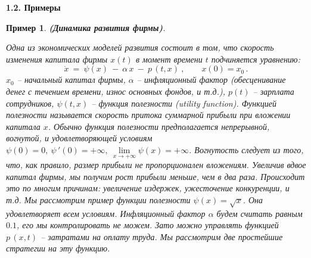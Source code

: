 \documentclass[12pt,a4paper]{article}
\newtheorem{ex}{Пример}
\begin{document}
\begin{center}
\textbf{1.2. Примеры}
\end{center}
\medskip

\begin{ex}\label{ex.firm}\textbf{(Динамика развития фирмы)}.
{\em Одна из экономических моделей развития состоит в том, что скорость изменения 
капитала фирмы $x(t)$ в момент времени $t$ подчиняется уравнению: 
$$
\dot x \ = \  \psi(x) \ - \ \alpha \, x  \ - \ p\, (t, x)\ ,\qquad x(0) = x_0\, .  
$$  
$x_0$ -- начальный капитал фирмы, $\alpha$ -- инфляционный фактор (обесценивание денег с течением времени, 
износ основных фондов, и т.д.), 
$p(t)$ -- зарплата сотрудников, $\psi(t, x)$ -- функция полезности (utility function). 
Функцией полезности называется скорость притока суммарной прибыли при 
вложении капитала $x$. Обычно функция полезности предполагается непрерывной, вогнутой, 
и удовлетворяющей условиям $\psi(0) = 0, \ \psi\,'(0) = +\infty , \  
\lim\limits_{x\to +\infty}\psi(x) = +\infty$. 
Вогнутость следует из того, что, как правило, размер прибыли не пропорционален вложениям. 
Увеличив вдвое капитал фирмы, мы получим рост прибыли меньше, чем в два раза. 
Происходит это по многим причинам: увеличение издержек, ужесточение конкуренции, и т.д.
 Мы рассмотрим пример 
функции полезности $\psi(x) = \sqrt{x}$. Она удовлетворяет всем условиям. 
Инфляционный фактор $\alpha$ будем считать равным $0.1$, его мы контролировать не можем. 
Зато можно управлять функцией $p\,(x, t)$ -- затратами на оплату труда. Мы рассмотрим две 
простейшие стратегии на эту функцию.  
\smallskip 

}
\end{ex}
\end{document}
